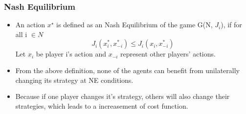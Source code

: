 \begin{frame}
\frametitle{\normalsize{Nash Equilibrium}}\transwipe
\begin{itemize}

\item An action $x^\star$ is defined as an \textcolor[rgb]{0.00,0.00,1.00}{Nash Equilibrium} of the game G(N, $J_i$), if for all i $\in N$
\begin{equation}
  J_i\left(x_i^*, x_{-i}^*\right) \leq J_i\left(x_i, x_{-i}^*\right)
\end{equation}
Let $x_i$ be player i's action and $x_{-i}$ represent other players’ actions.
\vspace{6pt}

\item From the above definition, none of the agents can benefit from \textcolor[rgb]{0.00,0.00,1.00}{unilaterally} changing its strategy at NE conditions.
\vspace{6pt}

\item Because if one player changes it's strategy, others will also change their strategies, which leads to a increasement of cost function. 



\end{itemize}

\end{frame}
